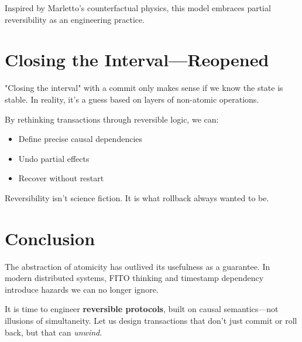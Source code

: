 \documentclass[../../../OAE-SPEC-MAIN.tex]{subfiles}
\begin{document}
Inspired by Marletto's counterfactual physics, this model embraces partial reversibility as an engineering practice.

\section{Closing the Interval—Reopened}
"Closing the interval" with a commit only makes sense if we know the state is stable. In reality, it's a guess based on layers of non-atomic operations.

By rethinking transactions through reversible logic, we can:
\begin{itemize}
  \item Define precise causal dependencies
  \item Undo partial effects
  \item Recover without restart
\end{itemize}

Reversibility isn't science fiction. It is what rollback always wanted to be.

\section{Conclusion}
The abstraction of atomicity has outlived its usefulness as a guarantee. In modern distributed systems, FITO thinking and timestamp dependency introduce hazards we can no longer ignore.

It is time to engineer \textbf{reversible protocols}, built on causal semantics—not illusions of simultaneity. Let us design transactions that don't just commit or roll back, but that can \emph{unwind}.
\end{document}
